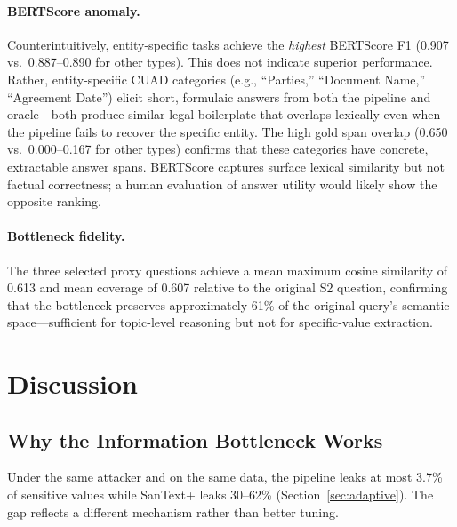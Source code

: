 \documentclass[sigconf,balance=false]{acmart}
\begin{document}
\paragraph{BERTScore anomaly.} Counterintuitively, entity-specific tasks achieve the \emph{highest} BERTScore F1 (0.907 vs.\ 0.887--0.890 for other types). This does not indicate superior performance. Rather, entity-specific CUAD categories (e.g., ``Parties,'' ``Document Name,'' ``Agreement Date'') elicit short, formulaic answers from both the pipeline and oracle---both produce similar legal boilerplate that overlaps lexically even when the pipeline fails to recover the specific entity. The high gold span overlap (0.650 vs.\ 0.000--0.167 for other types) confirms that these categories have concrete, extractable answer spans. BERTScore captures surface lexical similarity but not factual correctness; a human evaluation of answer utility would likely show the opposite ranking.

\paragraph{Bottleneck fidelity.} The three selected proxy questions achieve a mean maximum cosine similarity of 0.613 and mean coverage of 0.607 relative to the original S2 question, confirming that the bottleneck preserves approximately 61\% of the original query's semantic space---sufficient for topic-level reasoning but not for specific-value extraction.



\section{Discussion}
\label{sec:discussion}

\subsection{Why the Information Bottleneck Works}
\label{sec:why-works}

Under the same attacker and on the same data, the pipeline leaks at most 3.7\% of sensitive values while SanText+ leaks 30--62\% (Section~\ref{sec:adaptive}). The gap reflects a different mechanism rather than better tuning.
\end{document}
